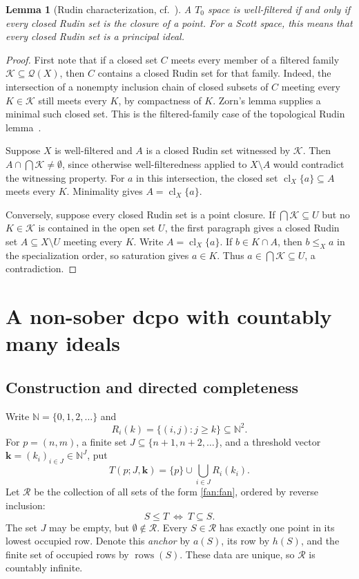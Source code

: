\documentclass[fleqn,preprint,3p,a4paper]{elsarticle}
\newtheorem{lemma}[theorem]{Lemma}
\theoremstyle{definition}
\newcommand{\N}{\mathbb N}
\newcommand{\RR}{\mathcal R}
\newcommand{\rows}{\operatorname{rows}}
\begin{document}
\begin{lemma}[Rudin characterization, cf.~\cite{XZ}]\label{wf:rudin-characterization}
A $T_0$ space is well-filtered if and only if every closed Rudin set is the closure of a point. For a Scott space, this means that every closed Rudin set is a principal ideal.
\end{lemma}
\begin{proof}
First note that if a closed set $C$ meets every member of a filtered family $\mathcal K\subseteq\mathcal Q(X)$, then $C$ contains a closed Rudin set for that family. Indeed, the intersection of a nonempty inclusion chain of closed subsets of $C$ meeting every $K\in\mathcal K$ still meets every $K$, by compactness of $K$. Zorn's lemma supplies a minimal such closed set. This is the filtered-family case of the topological Rudin lemma~\cite{XZ}.

Suppose $X$ is well-filtered and $A$ is a closed Rudin set witnessed by $\mathcal K$. Then $A\cap\bigcap\mathcal K\ne\emptyset$, since otherwise well-filteredness applied to $X\setminus A$ would contradict the witnessing property. For $a$ in this intersection, the closed set $\operatorname{cl}_X\{a\}\subseteq A$ meets every $K$. Minimality gives $A=\operatorname{cl}_X\{a\}$.

Conversely, suppose every closed Rudin set is a point closure. If $\bigcap\mathcal K\subseteq U$ but no $K\in\mathcal K$ is contained in the open set $U$, the first paragraph gives a closed Rudin set $A\subseteq X\setminus U$ meeting every $K$. Write $A=\operatorname{cl}_X\{a\}$. If $b\in K\cap A$, then $b\leq_X a$ in the specialization order, so saturation gives $a\in K$. Thus $a\in\bigcap\mathcal K\subseteq U$, a contradiction.
\end{proof}

\section{A non-sober dcpo with countably many ideals}\label{sec:fan}
\subsection{Construction and directed completeness}
Write $\N=\{0,1,2,\ldots\}$ and
\[
 R_i(k)=\{(i,j):j\geq k\}\subseteq\N^2.
\]
For $p=(n,m)$, a finite set $J\subseteq\{n+1,n+2,\ldots\}$, and a threshold vector $\mathbf k=(k_i)_{i\in J}\in\N^J$, put
\begin{equation}\label{fan:fan}
 T(p;J,\mathbf k)=\{p\}\cup\bigcup_{i\in J}R_i(k_i).
\end{equation}
Let $\RR$ be the collection of all sets of the form \eqref{fan:fan}, ordered by reverse inclusion:
\[
 S\leq T~\Longleftrightarrow~ T\subseteq S.
\]
The set $J$ may be empty, but $\emptyset\notin\RR$. Every $S\in\RR$ has exactly one point in its lowest occupied row. Denote this \emph{anchor} by $a(S)$, its row by $h(S)$, and the finite set of occupied rows by $\rows(S)$. These data are unique, so $\RR$ is countably infinite.
\end{document}
